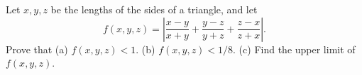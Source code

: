 Let $x, y, z$ be the lengths of the sides of a triangle, and let
\[ f(x, y, z) = \left|\frac{x - y}{x + y} + \frac{y - z}{y + z} + \frac{z - x}{z + x}\right|. \]
Prove that (a) $f(x, y, z) < 1$. (b) $f(x, y, z) < 1/8$. (c) Find the upper limit of $f(x, y, z)$.
